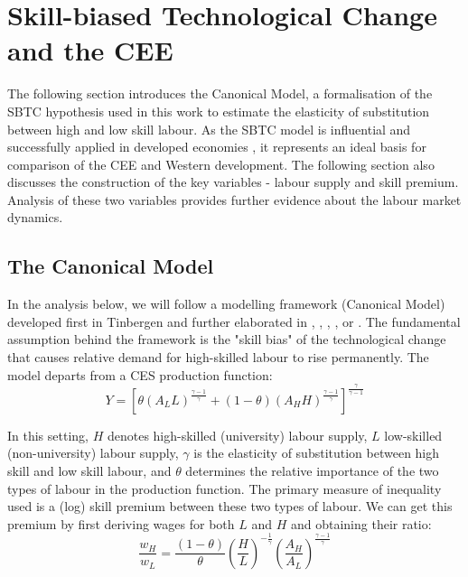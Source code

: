\documentclass[11pt]{article}
\begin{document}

\newpage
\section{Skill-biased Technological Change and the CEE}\label{skill_bias_cee}
The following section introduces the Canonical Model, a formalisation of the SBTC hypothesis used in this work to estimate the elasticity of substitution between high and low skill labour. As the SBTC model is influential and successfully applied in developed economies \citep{acemoglu2012does, glitz2021skill}, it represents an ideal basis for comparison of the CEE and Western development. The following section also discusses the construction of the key variables - labour supply and skill premium.  Analysis of these two variables provides further evidence about the labour market dynamics. 

\subsection{The Canonical Model}\label{canonical}
In the analysis below, we will follow a modelling framework (Canonical Model) developed first in Tinbergen and further elaborated in \citet{katz1992changes}, \citet{goldin2010race}, \citet{card2001can}, \citet{acemoglu2011skills}, or \citet{glitz2021skill}.
The fundamental assumption behind the framework is the "skill bias" of the technological change that causes relative demand for high-skilled labour to rise permanently.
The model departs from a CES production function:
\begin{equation}
\label{eqn:STBC_prod_function}
Y = [\theta(A_{L}L)^{\frac{\gamma - 1}{\gamma}} + (1 - \theta)(A_{H}H)^{\frac{\gamma - 1}{\gamma}}]^\frac{\gamma}{\gamma - 1}
\end{equation}

In this setting, $H$ denotes high-skilled (university) labour supply, $L$ low-skilled (non-university) labour supply, $\gamma$ is the elasticity of substitution between high skill and low skill labour, and $\theta$ determines the relative importance of the two types of labour in the production function. The primary measure of inequality used is a (log) skill premium between these two types of labour. We can get this premium by first deriving wages for both $L$ and $H$ and obtaining their ratio:
\[\frac{w_{H}}{w_{L}} = \frac{(1 - \theta)}{\theta} \left(\frac{H}{L}\right)^{-\frac{1}{\gamma}}\left(\frac{A_{H}}{A_{L}}\right)^{\frac{\gamma - 1}{\gamma}}\]
\end{document}
